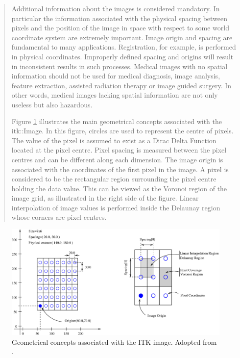 \documentclass[]{report}
\begin{document}
\begin{quote}
Additional information about the images is considered mandatory.
In particular the information associated with the physical spacing
between pixels and the position of the image in space with respect
to some world coordinate system are extremely important. Image
origin and spacing are fundamental to many applications.
Registration, for example, is performed in physical coordinates.
Improperly defined spacing and origins will result in inconsistent
results in such processes. Medical images with no spatial
information should not be used for medical diagnosis, image
analysis, feature extraction, assisted radiation therapy or image
guided surgery. In other words, medical images lacking spatial
information are not only useless but also hazardous.

Figure \ref{fig:image} illustrates the main geometrical concepts
associated with the itk::Image. In this figure, circles are used
to represent the centre of pixels. The value of the pixel is
assumed to exist as a Dirac Delta Function located at the pixel
centre. Pixel spacing is measured between the pixel centres and
can be different along each dimension. The image origin is
associated with the coordinates of the first pixel in the image. A
pixel is considered to be the rectangular region surrounding the
pixel centre holding the data value. This can be viewed as the
Voronoi region of the image grid, as illustrated in the right side
of the figure. Linear interpolation of image values is performed
inside the Delaunay region whose corners are pixel centres.
\end{quote}

\begin{figure}[tb]
\centering
\includegraphics[width=12cm]{ImageOriginAndSpacing.eps}
\caption{Geometrical concepts associated with the ITK image.
Adopted from \citet{ITKSoftwareGuideSecondEdition}.}
\label{fig:image}
\end{figure}
\end{document}
